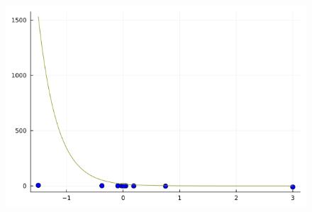 \documentclass[a4paper,10pt,BCOR10mm,oneside,headsepline]{scrartcl}
\begin{document}
\begin{figure}[h]
\centering
\includegraphics[scale=0.75]{testPlotEulerForward.png}
\end{figure}

\newpage
\end{document}
